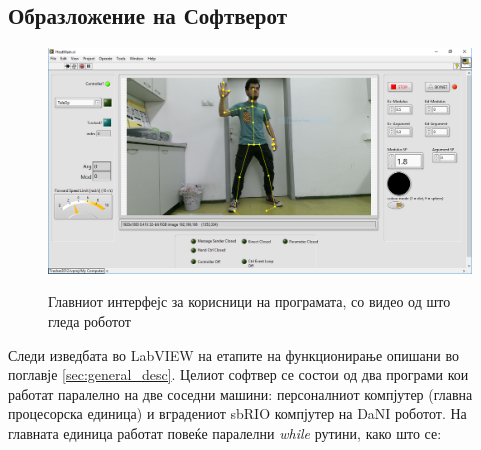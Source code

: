 \documentclass[12pt]{article}
\begin{document}
  \subsection{Образложение на Софтверот}

    \begin{figure}[H]
      \centering
      \includegraphics[width = 0.75\linewidth]{./images/pineapple_summer.png}
      \label{fig:pineapple}
      \caption{Главниот интерфејс за корисници на програмата, со видео од што гледа роботот}
    \end{figure}
    Следи изведбата во LabVIEW на етапите на функционирање опишани во поглавје \ref{sec:general_desc}. Целиот софтвер се состои од два програми кои работат паралелно на две соседни машини: персоналниот компјутер (главна процесорска единица) и вградениот sbRIO компјутер на DaNI роботот. На главната единица работат повеќе паралелни \textit{while} рутини, како што се:
\end{document}
